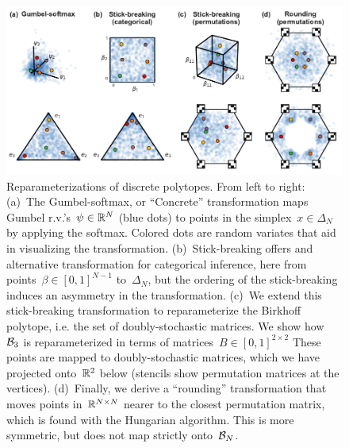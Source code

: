 \documentclass[twoside]{article}
\begin{document}
\begin{figure}[ht!]
  \centering
  \includegraphics[width=6.5in]{figure1.pdf} 
  \caption{Reparameterizations of discrete polytopes.  From left to
    right: (a)~The Gumbel-softmax, or ``Concrete'' transformation maps
    Gumbel r.v.'s~${\psi \in \mathbb{R}^N}$ (blue dots) to points in the
    simplex~${x \in \Delta_{N}}$ by applying the softmax.  Colored
    dots are random variates that aid in visualizing the
    transformation.  (b)~Stick-breaking offers and alternative
    transformation for categorical inference, here from
    points~$\beta \in [0,1]^{N-1}$ to~$\Delta_N$, but the ordering of
    the stick-breaking induces an asymmetry in the transformation.
    (c)~We extend this stick-breaking transformation to reparameterize
    the Birkhoff polytope, i.e. the set of doubly-stochastic
    matrices. We show how~$\mathcal{B}_3$ is reparameterized in terms of
    matrices~$B \in [0,1]^{2 \times 2}$ These points are mapped to
    doubly-stochastic matrices, which we have projected
    onto~$\mathbb{R}^2$ below (stencils show permutation matrices at the
    vertices).  (d)~Finally, we derive a ``rounding'' transformation
    that moves points in~$\mathbb{R}^{N \times N}$ nearer to the closest
    permutation matrix, which is found with the Hungarian algorithm.
    This is more symmetric, but does not map strictly onto~$\mathcal{B}_N$.
  }
\label{fig:transforms}
\end{figure}
\end{document}
